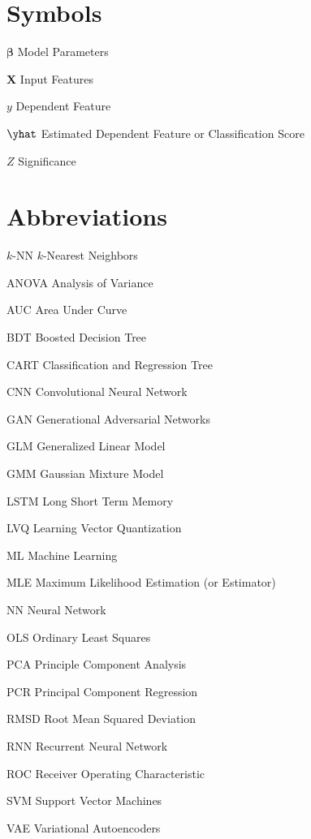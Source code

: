 \abbreviations

\section*{Symbols}

\begin{symbollist}
	\item[$\bm{\beta}$] Model Parameters
	\item[$\mathbf{X}$] Input Features
	\item[$y$] Dependent Feature
	\item[$\yhat$] Estimated Dependent Feature or Classification Score
	\item[$Z$] Significance
\end{symbollist}

\section*{Abbreviations}

\begin{symbollist}
	\item[$k$-NN] $k$-Nearest Neighbors
	\item[ANOVA] Analysis of Variance
	\item[AUC] Area Under Curve
	\item[BDT] Boosted Decision Tree
	\item[CART] Classification and Regression Tree
	\item[CNN] Convolutional Neural Network
	\item[GAN] Generational Adversarial Networks
	\item[GLM] Generalized Linear Model
	\item[GMM] Gaussian Mixture Model
	\item[LSTM] Long Short Term Memory
	\item[LVQ] Learning Vector Quantization
	\item[ML] Machine Learning
	\item[MLE] Maximum Likelihood Estimation (or Estimator)
	\item[NN] Neural Network
	\item[OLS] Ordinary Least Squares
	\item[PCA] Principle Component Analysis
	\item[PCR] Principal Component Regression
	\item[RMSD] Root Mean Squared Deviation
	\item[RNN] Recurrent Neural Network
	\item[ROC] Receiver Operating Characteristic
	\item[SVM] Support Vector Machines
	\item[VAE] Variational Autoencoders
\end{symbollist}
